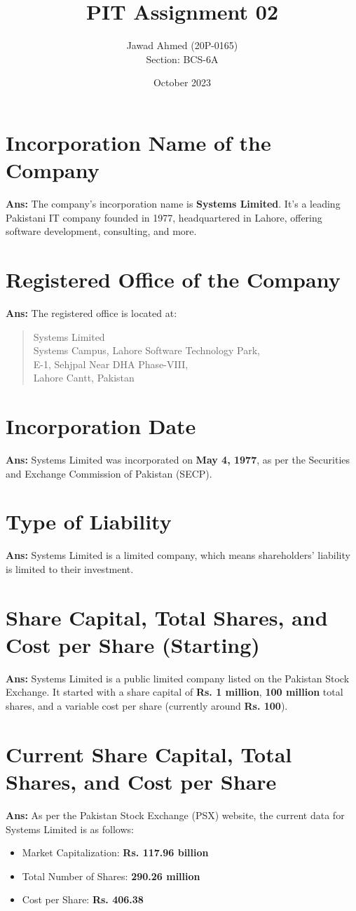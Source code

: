 \documentclass{article}
\title{PIT Assignment 02}
\author{Jawad Ahmed (20P-0165) \\ Section: BCS-6A}
\date{October 2023}
\begin{document}
\maketitle

\section{Incorporation Name of the Company}
\textbf{Ans:} The company's incorporation name is \textbf{Systems Limited}. It's a leading Pakistani IT company founded in 1977, headquartered in Lahore, offering software development, consulting, and more.

\section{Registered Office of the Company}
\textbf{Ans:} The registered office is located at:
\begin{quote}
Systems Limited\\
Systems Campus, Lahore Software Technology Park,\\
E-1, Sehjpal Near DHA Phase-VIII,\\
Lahore Cantt, Pakistan
\end{quote}

\section{Incorporation Date}
\textbf{Ans:} Systems Limited was incorporated on \textbf{May 4, 1977}, as per the Securities and Exchange Commission of Pakistan (SECP).

\section{Type of Liability}
\textbf{Ans:} Systems Limited is a limited company, which means shareholders' liability is limited to their investment.

\section{Share Capital, Total Shares, and Cost per Share (Starting)}
\textbf{Ans:} Systems Limited is a public limited company listed on the Pakistan Stock Exchange. It started with a share capital of \textbf{Rs. 1 million}, \textbf{100 million} total shares, and a variable cost per share (currently around \textbf{Rs. 100}).

\section{Current Share Capital, Total Shares, and Cost per Share}
\textbf{Ans:} As per the Pakistan Stock Exchange (PSX) website, the current data for Systems Limited is as follows:
\begin{itemize}
    \item Market Capitalization: \textbf{Rs. 117.96 billion}
    \item Total Number of Shares: \textbf{290.26 million}
    \item Cost per Share: \textbf{Rs. 406.38}
\end{itemize}
\end{document}
